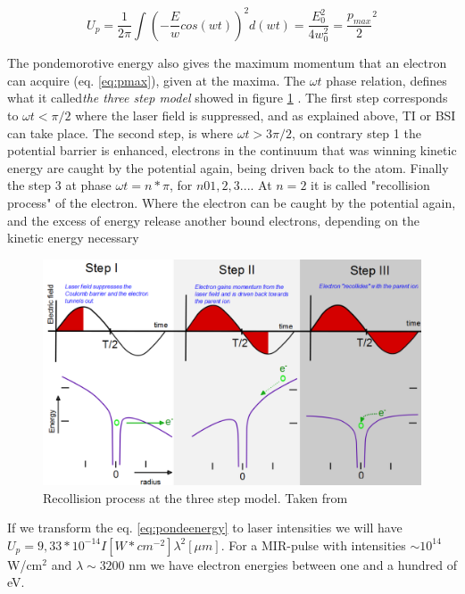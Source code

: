 \begin{equation} 
U_{p} = \dfrac{1}{2\pi} \int (-\dfrac{E}{w} cos (wt))^{2}d(wt) = \dfrac{E^{2}_{0}}{4w^{2}_{0}} = \dfrac{p_{max}}{2}^{2}
\label{eq:pondeenergy}
\end{equation}

The pondemorotive energy also gives the maximum momentum that an electron can acquire (eq. \ref{eq:pmax}), given at the maxima. The $\omega t$ phase relation, defines what it called\textit{the three step model} showed in figure \ref{fig:ponder} . The first step corresponds to $\omega t < \pi /2$ where the laser field is suppressed, and as explained above, TI or BSI can take place. The second step, is where $\omega t > 3\pi /2$, on contrary step 1 the potential barrier is enhanced, electrons in the continuum that was winning kinetic energy are caught by the potential again, being driven  back to the atom. Finally the step 3 at phase $\omega t = n* \pi$, for $n 0 1,2,3...$. At $n=2$ it is called "recollision process" of the electron. Where the electron can be caught by the potential again, and the excess of energy release another bound electrons, depending on the kinetic energy necessary \cite{krishnan_ignition_2012}

\begin{figure}[h!]
\centering
\includegraphics[width=12 cm]{../Images/ponderomotive steps.png}
\caption[Ponderomotive 3 steps]{Recollision  process at the three step model. Taken from \cite{krishnan_doped_2011}}
\label{fig:ponder}
\end{figure}


If we transform the eq. \ref{eq:pondeenergy} to laser intensities we will have $U_{p} = 9,33*10^{-14} I[W*cm^{-2}] \lambda^{2}[\mu m]$. For a MIR-pulse with intensities $\sim 10^{14}$ W/cm$^{2}$ and $\lambda \sim 3200$ nm we have electron energies between one and a hundred of eV.


